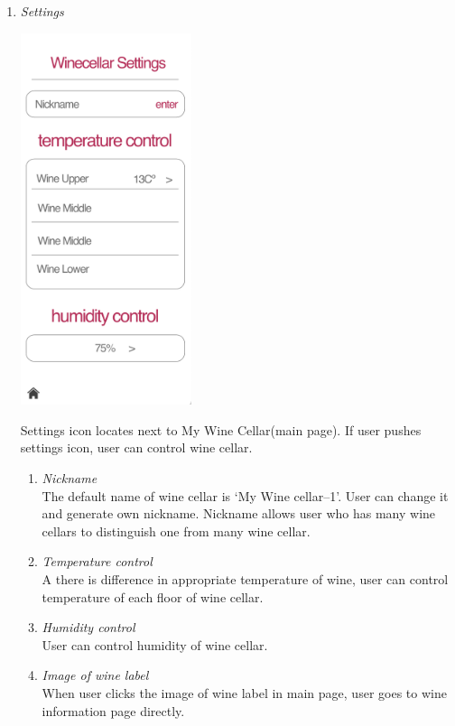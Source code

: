 \documentclass[conference]{IEEEtran}
\numberwithin{figure}{subsection}
\begin{document}
\begin{enumerate}
\begin{enumerate}
    \end{enumerate}
    \item \textit{Settings}\\
    \centerline{\includegraphics[width=5cm]{setting.png}}
    Settings icon locates next to My Wine Cellar(main page). If user pushes settings icon, user can control wine cellar.
    \begin{enumerate}
        \item \textit{Nickname}\\
        The default name of wine cellar is ‘My Wine cellar–1’. User can change it and generate own nickname. Nickname allows user who has many wine cellars to distinguish one from many wine cellar.
        \item \textit{Temperature control}\\
        A there is difference in appropriate temperature of wine, user can control temperature of each floor of wine cellar.
        \item \textit{Humidity control}\\
        User can control humidity of wine cellar.
        \item \textit{Image of wine label}\\
        When user clicks the image of wine label in main page, user goes to wine information page directly.
    \end{enumerate}
\end{enumerate}
\end{document}
